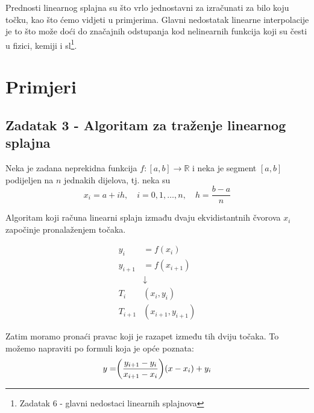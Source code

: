 \documentclass[12pt,a4paper]{report}
\begin{document}
	Prednosti linearnog splajna su što vrlo jednostavni za izračunati za bilo koju točku, kao što ćemo vidjeti u primjerima. Glavni nedostatak linearne interpolacije je to što može doći do značajnih odstupanja kod nelinearnih funkcija koji su česti u fizici, kemiji i sl\footnote{Zadatak 6 - glavni nedostaci linearnih splajnova}.
	\section{Primjeri}
		\subsection{Zadatak 3 - Algoritam za traženje linearnog splajna}
		Neka je zadana neprekidna funkcija $f:[a,b]\rightarrow \mathbb{R} $ i neka je segment $[a,b]$ podijeljen na $n$ jednakih dijelova, tj. neka su
		\begin{equation*}
			x_i=a+ih,\quad i=0,1,\ldots,n,\quad h=\frac{b-a}{n}
		\end{equation*}
		
		Algoritam koji računa linearni splajn izmađu dvaju ekvidistantnih čvorova $x_i$ započinje pronalaženjem točaka.
		
		\begin{align*}
			y_i&=f(x_i)\\
			y_{i+1}&=f(x_{i+1})\\
			&\downarrow\\
			T_i&(x_i, y_i)\\
			T_{i+1}&(x_{i+1}, y_{i+1})
		\end{align*}
		
		Zatim moramo pronaći pravac koji je razapet između tih dviju točaka. To možemo napraviti po formuli koja je opće poznata\cite{pmfPrezp5}:
		\begin{equation}
		y=\biggr{(}\frac{y_{i+1}-y_i}{x_{i+1}-x_i}\biggr{)}(x-x_i)+y_i
		\label{pravac}
		\end{equation}
		
		
\end{document}
